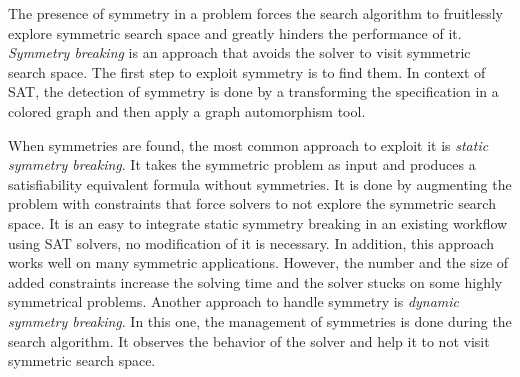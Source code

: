 The presence of symmetry in a problem forces the search algorithm to fruitlessly explore symmetric
search space and greatly hinders the performance of it. \textit{Symmetry breaking} is an approach that
avoids the solver to visit symmetric search space. The first step to exploit symmetry is to find them.
In context of SAT, the detection of symmetry is done by a transforming the specification
in a colored graph and then apply a graph automorphism tool.


%
%
%
%
%
%
%
%
%

When symmetries are found, the most common approach to exploit it is \emph{static symmetry breaking}.
It takes the symmetric problem as input and produces a satisfiability equivalent formula without symmetries.
It is done by augmenting the problem with constraints that force solvers to not explore the symmetric search 
space. It is an easy to integrate static symmetry breaking in an existing workflow using SAT solvers, no modification of it is necessary. In addition, this approach works well on many symmetric applications.
However, the number and the size of added constraints increase the solving time and the solver stucks
on some highly symmetrical problems.
Another approach to handle symmetry is \emph{dynamic symmetry breaking}. In this one, the management of
symmetries is done during the search algorithm. It observes the behavior of the solver and help it to
not visit symmetric search space.

